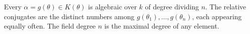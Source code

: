 Every $\alpha = g(\theta) \in K(\theta)$ is algebraic over $k$ of degree dividing $n$. The relative conjugates are the distinct numbers among $g(\theta_1),\ldots,g(\theta_n)$, each appearing equally often. The field degree $n$ is the maximal degree of any element.
